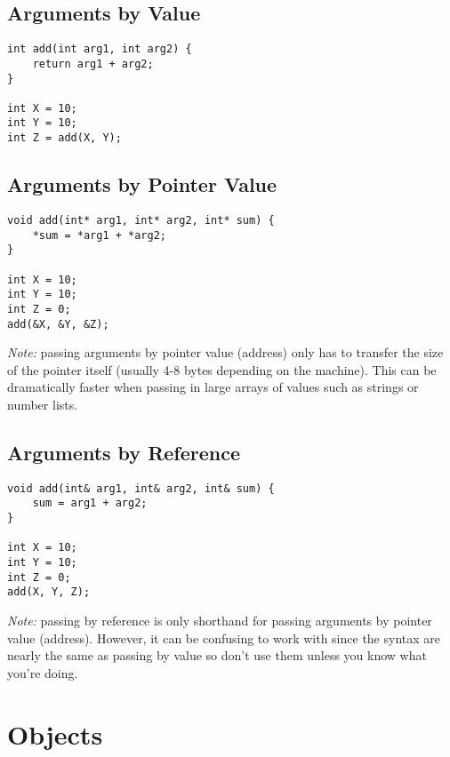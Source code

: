 \documentclass{article}
\begin{document}
\subsection{Arguments by Value}
\begin{lstlisting}
int add(int arg1, int arg2) {
	return arg1 + arg2;
}

int X = 10;
int Y = 10;
int Z = add(X, Y);
\end{lstlisting}

\subsection{Arguments by Pointer Value}
\begin{lstlisting}
void add(int* arg1, int* arg2, int* sum) {
	*sum = *arg1 + *arg2;
}

int X = 10;
int Y = 10;
int Z = 0;
add(&X, &Y, &Z);
\end{lstlisting}
\emph{Note:} passing arguments by pointer value (address) only has to transfer the size of the pointer itself (usually 4-8 bytes depending on the machine). This can be dramatically faster when passing in large arrays of values such as strings or number lists. 

\subsection{Arguments by Reference}
\begin{lstlisting}
void add(int& arg1, int& arg2, int& sum) {
	sum = arg1 + arg2;
}

int X = 10;
int Y = 10;
int Z = 0;
add(X, Y, Z);
\end{lstlisting}

\emph{Note:} passing by reference is only shorthand for passing arguments by pointer value (address). However, it can be confusing to work with since the syntax are nearly the same as passing by value so don't use them unless you know what you're doing.

\section{Objects}
\end{document}
